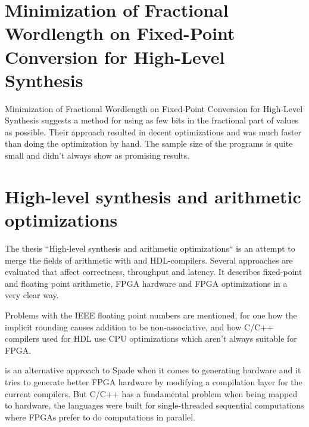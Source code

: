 \documentclass[msc,lith,english]{liuthesis}
\begin{document}
\section{Minimization of Fractional Wordlength on Fixed-Point Conversion for High-Level Synthesis}
Minimization of Fractional Wordlength on Fixed-Point Conversion for High-Level Synthesis suggests a method for using as few bits in the fractional part of values as possible. Their approach resulted in decent optimizations and was much faster than doing the optimization by hand. The sample size of the programs is quite small and didn't always show as promising results.

\cite{src:MinOfFrac}

\section{High-level synthesis and arithmetic optimizations}
The thesis ``High-level synthesis and arithmetic optimizations`` is an attempt to merge the fields of arithmetic with and HDL-compilers. Several approaches are evaluated that affect correctness, throughput and latency. It describes fixed-point and floating point arithmetic, FPGA hardware and FPGA optimizations in a very clear way.

Problems with the IEEE floating point numbers are mentioned, for one how the implicit rounding causes addition to be non-associative, and how C/C++ compilers used for HDL use CPU optimizations which aren't always suitable for FPGA.

\citeauthor{src:HLSandOpt} is an alternative approach to Spade when it comes to generating hardware and it tries to generate better FPGA hardware by modifying a compilation layer for the current compilers. But C/C++ has a fundamental problem when being mapped to hardware, the languages were built for single-threaded sequential computations where FPGAs prefer to do computations in parallel.

\cite{src:HLSandOpt}

\end{document}
